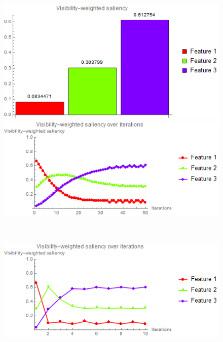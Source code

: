 \begin{figure}
\begin{minipage}{.24\textwidth}
		\subcaption{}
	\end{minipage}~
	\begin{minipage}{.24\textwidth}
		\includegraphics[width=1\linewidth]{images/CT-Knee_naive_optimized_linesearch_visibility_saliency_weighted_chart}
		\subcaption{}
	\end{minipage}	
	
	\begin{minipage}{.49\textwidth}
		\includegraphics[width=1\linewidth]{images/CT-Knee_naive_saliency_fixed}
		\subcaption{}
	\end{minipage}~
	\begin{minipage}{.49\textwidth}
		\includegraphics[width=1\linewidth]{images/CT-Knee_naive_saliency_parallelsearch}
		\subcaption{}
	\end{minipage}
	

\end{figure}

